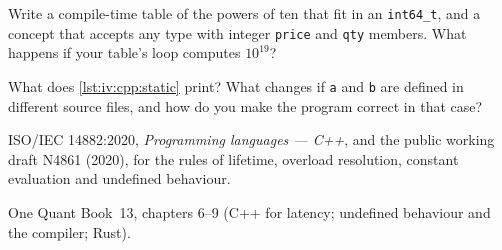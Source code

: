 \begin{interviewq}\label{iq:iv:cpp:13}
Write a compile-time table of the powers of ten that fit in an \texttt{int64\_t}, and a concept that accepts any type with
integer \texttt{price} and \texttt{qty} members. What happens if your table's loop computes $10^{19}$?
\end{interviewq}

\label{lst:iv:cpp:static}

\begin{interviewq}\label{iq:iv:cpp:14}
What does \cref{lst:iv:cpp:static} print? What changes if \texttt{a} and \texttt{b} are defined in different source files,
and how do you make the program correct in that case?
\end{interviewq}

\begin{omsources}
\item ISO/IEC 14882:2020, \emph{Programming languages --- C++}, and the public working draft N4861 (2020), for the rules of
lifetime, overload resolution, constant evaluation and undefined behaviour.
\item One Quant Book~13, chapters 6--9 (C++ for latency; undefined behaviour and the compiler; Rust).
\end{omsources}
